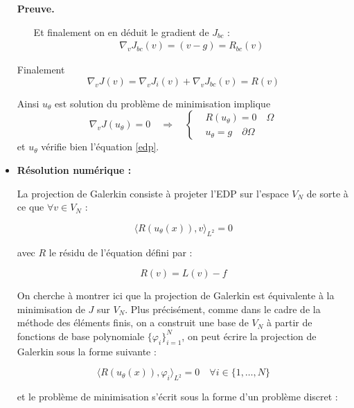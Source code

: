 \documentclass[french]{article}
\newenvironment{preuve}[1][]{\begin{tcolorbox}[
	colback=white, %
	colframe=green!70!black, %
	arc=2mm, %
	boxrule=1pt, %
	breakable, enhanced jigsaw
	]
	\textcolor{green!70!black}{\textbf{Preuve.} \\}

	#1
}{\end{tcolorbox}}
\begin{document}
\begin{itemize}[label=]
\begin{preuve}
\begin{itemize}[label=\textbullet]
				Et finalement on en déduit le gradient de $J_{bc}$ :
				\begin{align*}
					\nabla_v J_{bc}(v) = (v-g) = R_{bc}(v) 
				\end{align*}
			\end{itemize}
		
			Finalement
			\begin{equation*}
				\nabla_v J(v) = \nabla_v  J_{i}(v) + \nabla_v J_{bc}(v) = R(v)
			\end{equation*}
		
			Ainsi $u_\theta$ est solution du problème de minimisation implique
			\begin{equation*}
				\nabla_v J(u_\theta)=0 \quad \Rightarrow \quad \left\{\begin{aligned}
					&R(u_\theta)=0 \quad \Omega \\
					&u_\theta=g \quad \partial\Omega
				\end{aligned}\right.
			\end{equation*}
			et $u_\theta$ vérifie bien l'équation \eqref{edp}.
		\end{preuve}
		
		\item \textbf{Résolution numérique :}
		
		La projection de Galerkin consiste à projeter l'EDP sur l'espace $V_N$ de sorte à ce que $\forall v \in V_N$ :
		
		\begin{equation*}
			\langle R(u_\theta(x)), v\rangle_{L^2} = 0
		\end{equation*}
		
		avec $R$ le résidu de l'équation défini par :
		
		\begin{equation*}
			R(v) = L(v) - f
		\end{equation*}
		
		On cherche à montrer ici que la projection de Galerkin est équivalente à la minimisation de $J$ sur $V_N$. Plus précisément, comme dans le cadre de la méthode des éléments finis, on a construit une base de $V_N$ à partir de fonctions de base polynomiale $\{\varphi_i\}_{i=1}^N$, on peut écrire la projection de Galerkin sous la forme suivante :

		\begin{equation*}
			\langle R(u_\theta(x)), \varphi_i\rangle_{L^2} = 0 \quad \forall i \in \{1,\dots,N\}
		\end{equation*}

		et le problème de minimisation s'écrit sous la forme d'un problème discret :
		

\end{itemize}
\end{document}
